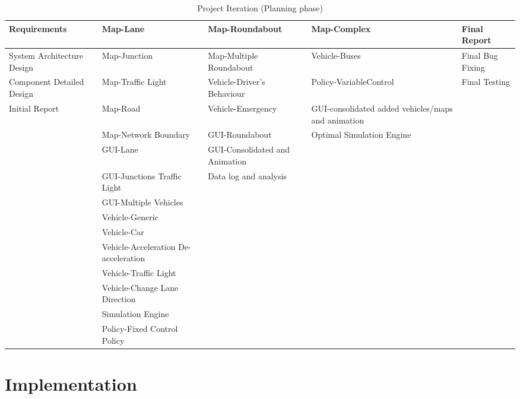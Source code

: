 \documentclass[11pt]{article}
\begin{document}
\begin{center}
\begin{table}[!htb]
\begin{tabular}{|m{2.5cm}|m{3.5cm}|m{2.5cm}|m{2.5cm}|m{2.2cm}|}
		Requirements & Map-Lane & Map-Roundabout & Map-Complex & Final Report\\ \hline
		
		System Architecture Design & Map-Junction & Map-Multiple Roundabout & Vehicle-Buses & Final Bug Fixing\\ \hline
		
		Component Detailed Design & Map-Traffic Light & Vehicle-Driver's Behaviour & Policy-VariableControl & Final Testing\\ \hline
		
		Initial Report & Map-Road & Vehicle-Emergency & GUI-consolidated added vehicles/maps and animation & \\ \hline
		
		& Map-Network Boundary & GUI-Roundabout & Optimal Simulation Engine & \\ \hline
		
		& GUI-Lane & GUI-Consolidated and Animation && \\ \hline
		
		& GUI-Junctions Traffic Light & Data log and analysis & &\\ \hline
		& GUI-Multiple Vehicles &&&\\ \hline
		& Vehicle-Generic &&& \\ \hline
		& Vehicle-Car &&& \\ \hline
		& Vehicle-Acceleration De-acceleration &&& \\ \hline
		& Vehicle-Traffic Light &&& \\ \hline
		& Vehicle-Change Lane Direction &&& \\ \hline
		& Simulation Engine &&& \\ \hline
		& Policy-Fixed Control Policy &&&\\ \hline
		\end{tabular}
		\caption{Project Iteration (Planning phase)}
		\label{table:iteration} 
		\end{table}
\end{center}
 
	
\section{Implementation} 
\end{document}
